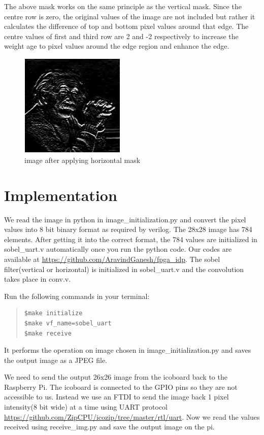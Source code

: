 \documentclass[11pt]{article}
\begin{document}
The above mask works on the same principle as the vertical mask. Since the centre row is zero, the original values of the image are not included but rather it calculates the difference of top and bottom pixel values around that edge. The centre values of first and third row are 2 and -2 respectively to increase the weight age to pixel values around the edge region and enhance the edge.

\begin{figure}[htp]
\centering
\includegraphics[width=5cm]{sobel3.jpg}
\caption{image after applying horizontal mask}
\label{fig:Einstein Vertical}
\end{figure}

\section{Implementation}
We read the image in python in image\_initialization.py and convert the pixel values into 8 bit binary format as required by verilog. The 28x28 image has 784 elements. After getting it into the correct format, the 784 values are initialized in sobel\_uart.v automatically once you run the python code. Our codes are available at \url{https://github.com/AravindGanesh/fpga_idp}. The sobel filter(vertical or horizontal) is initialized in sobel\_uart.v and the convolution takes place in conv.v. 

Run the following commands in your terminal:
\begin{quote}
\begin{verbatim}
$make initialize
$make vf_name=sobel_uart
$make receive
\end{verbatim}
\end{quote}

It performs the operation on image chosen in image\_initialization.py and saves the output image as a JPEG file.

We need to send the output 26x26 image from the icoboard back to the Raspberry Pi. The icoboard is connected to the GPIO pins so they are not accessible to us. Instead we use an FTDI to send the image back 1 pixel intensity(8 bit wide) at a time using UART protocol \url{https://github.com/ZipCPU/icozip/tree/master/rtl/uart}. Now we read the values received using receive\_img.py and save the output image on the pi.
\end{document}
